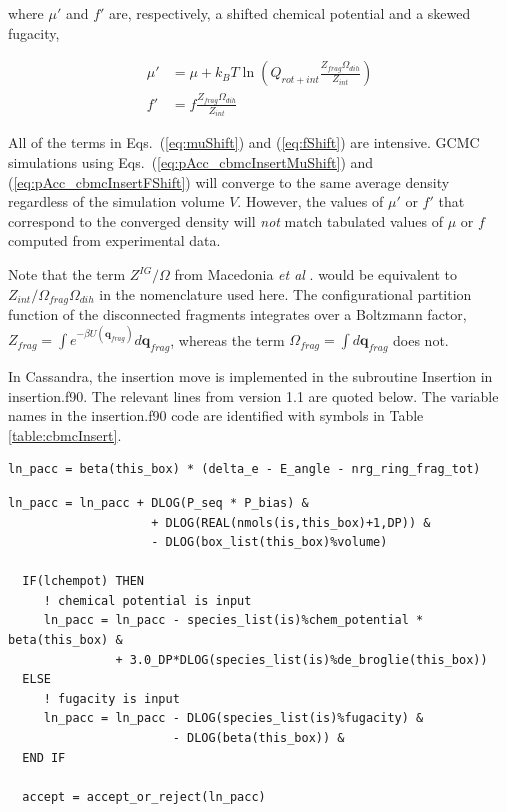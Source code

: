 where $\mu'$ and $f'$ are, respectively, a shifted chemical potential and a skewed fugacity,

\begin{align}
\label{eq:muShift}
\mu'&=\mu+k_BT\ln\left( Q_{rot+int} \frac{Z_{frag}\Omega_{dih}}{Z_{int}} \right) \\
\label{eq:fShift}
f'&= f \frac{Z_{frag}\Omega_{dih}}{Z_{int}}
\end{align}

All of the terms in Eqs.\ (\ref{eq:muShift}) and (\ref{eq:fShift}) are intensive. GCMC simulations using Eqs.\ (\ref{eq:pAcc_cbmcInsertMuShift}) and (\ref{eq:pAcc_cbmcInsertFShift}) will converge to the same average density regardless of the simulation volume $V$. However, the values of $\mu'$ or $f'$ that correspond to the converged density will {\em not} match tabulated values of $\mu$ or $f$ computed from experimental data.

Note that the term $Z^{IG}/\Omega$ from Macedonia {\em et al} \cite{Macedonia:1999}. would be equivalent to $Z_{int}/\Omega_{frag}\Omega_{dih}$ in the nomenclature used here. The configurational partition function of the disconnected fragments integrates over a Boltzmann factor, $Z_{frag} = \int e^{-\beta U(\mathbf{q}_{frag})} d\mathbf{q}_{frag}$, whereas the term $\Omega_{frag} = \int d\mathbf{q}_{frag}$ does not.

In Cassandra, the insertion move is implemented in the subroutine Insertion in insertion.f90. The relevant lines from version 1.1 are quoted below. The variable names in the insertion.f90 code are identified with symbols in Table \ref{table:cbmcInsert}.

\begin{minipage}{\linewidth}
\begin{lstlisting}[firstnumber=441, caption=insertion.f90]
  ln_pacc = beta(this_box) * (delta_e - E_angle - nrg_ring_frag_tot)
\end{lstlisting}
\begin{lstlisting}[firstnumber=447]
  ln_pacc = ln_pacc + DLOG(P_seq * P_bias) &
                    + DLOG(REAL(nmols(is,this_box)+1,DP)) &
                    - DLOG(box_list(this_box)%volume)

  IF(lchempot) THEN
     ! chemical potential is input
     ln_pacc = ln_pacc - species_list(is)%chem_potential * beta(this_box) &
               + 3.0_DP*DLOG(species_list(is)%de_broglie(this_box))
  ELSE   
     ! fugacity is input
     ln_pacc = ln_pacc - DLOG(species_list(is)%fugacity) &
                       - DLOG(beta(this_box)) &
  END IF 

  accept = accept_or_reject(ln_pacc)
\end{lstlisting}
\end{minipage}

